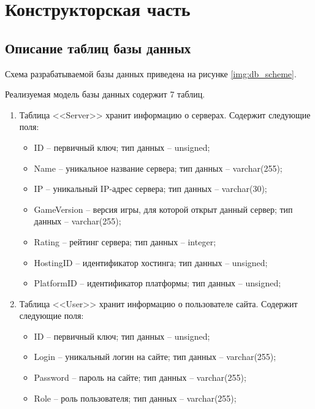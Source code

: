 \chapter{Конструкторская часть}

\section{Описание таблиц базы данных}

Схема разрабатываемой базы данных приведена на рисунке \ref{img:db_scheme}.


Реализуемая модель базы данных содержит 7 таблиц.

\begin{enumerate}
    \item Таблица <<Server>> хранит информацию о серверах. Содержит следующие поля:
        \begin{itemize}
            \item ID -- первичный ключ; тип данных -- unsigned;
            \item Name -- уникальное название сервера; тип данных -- varchar(255);
            \item IP -- уникальный IP-адрес сервера; тип данных -- varchar(30);
            \item GameVersion -- версия игры, для которой открыт данный сервер; тип данных -- varchar(255);
            \item Rating -- рейтинг сервера; тип данных -- integer;
            \item HostingID -- идентификатор хостинга; тип данных -- unsigned;
            \item PlatformID -- идентификатор платформы; тип данных -- unsigned;
        \end{itemize}

        \item Таблица <<User>> хранит информацию о пользователе сайта. Содержит следующие поля:
        \begin{itemize}
            \item ID -- первичный ключ; тип данных -- unsigned;
            \item Login -- уникальный логин на сайте; тип данных -- varchar(255);
            \item Password -- пароль на сайте; тип данных -- varchar(255);
            \item Role -- роль пользователя; тип данных -- varchar(255);
        \end{itemize}


\end{enumerate}
